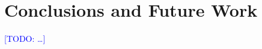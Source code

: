 \documentclass[runningheads]{llncs}
\newcommand{\todo}[1]{\textcolor{blue}{[TODO: #1]}}
\begin{document}
\section{Conclusions and Future Work}
\label{sec:con}

\todo{\ldots}





\end{document}
